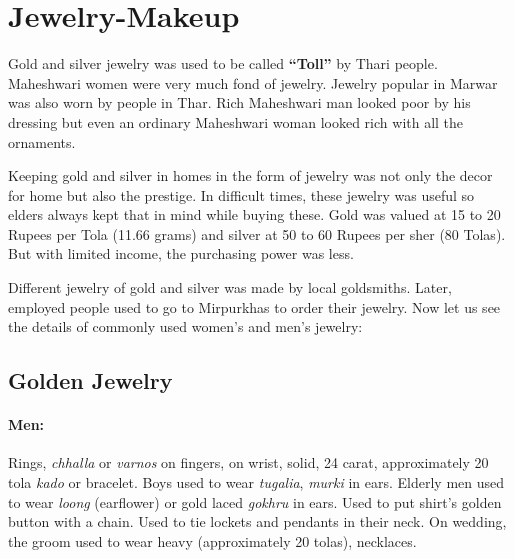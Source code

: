 \section{Jewelry-Makeup} Gold and silver jewelry was used to be called
\textbf{``Toll''} by Thari people. Maheshwari women were very much fond of
jewelry. Jewelry popular in Marwar was also worn by people in Thar. Rich
Maheshwari man looked poor by his dressing but even an ordinary Maheshwari woman
looked rich with all the ornaments.

Keeping gold and silver in homes in the form of jewelry was not only the decor
for home but also the prestige. In difficult times, these jewelry was useful so
    elders always kept that in mind while buying these. Gold was valued at 15 to
    20 Rupees per Tola (11.66 grams) and silver at 50 to 60 Rupees per sher (80
    Tolas). But with limited income, the purchasing power was less.

Different jewelry of gold and silver was made by local goldsmiths. Later,
employed people used to go to Mirpurkhas to order their jewelry. Now let us see
the details of commonly used women's and men's jewelry:
\subsection{Golden Jewelry}
\paragraph{Men:} Rings, \textit{chhalla} or \textit{varnos} on fingers, on
wrist, solid, 24 carat, approximately 20 tola \textit{kado} or bracelet. Boys
used to wear \textit{tugalia}, \textit{murki} in ears. Elderly men used to wear
\textit{loong} (earflower) or gold laced \textit{gokhru} in ears. Used to put
shirt's golden button with a chain. Used to tie lockets and pendants in their
neck. On wedding, the groom used to wear heavy (approximately 20 tolas),
necklaces.
